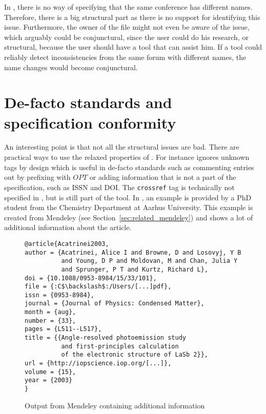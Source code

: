 In {\bibtex}, there is no way of specifying that the same conference
has different names.  Therefore, there is a big structural part as
there is no support for identifying this issue.  Furthermore, the
owner of the {\bibtex} file might not even be aware of the issue,
which arguably could be conjunctural, since the user could do his
research, or structural, because the user should have a tool that can
assist him.  If a tool could reliably detect inconsistencies from the
same forum with different names, the name changes would become
conjunctural.


\section{De-facto standards and specification conformity}
\label{sec:problems_de_facto}

An interesting point is that not all the structural issues are bad.
There are practical ways to use the relaxed properties of {\bibtex}.
For instance {\bibtex} ignores unknown tags by design which is useful
in de-facto standards such as commenting entries out by prefixing with
$OPT$ or adding information that is not a part of the {\bibtex}
specification, such as ISSN and DOI.  The \texttt{crossref} tag is
technically not specified in {\bibtex}, but is still part of the tool.
In , an example is provided by a PhD
student from the Chemistry Department at Aarhus University.  This
example is created from Mendeley (see
Section~\ref{sec:related_mendeley}) and shows a lot of additional
information about the article.

\begin{figure}
  \centering
\begin{small}
\begin{verbatim}
@article{Acatrinei2003,
author = {Acatrinei, Alice I and Browne, D and Losovyj, Y B
          and Young, D P and Moldovan, M and Chan, Julia Y
          and Sprunger, P T and Kurtz, Richard L},
doi = {10.1088/0953-8984/15/33/101},
file = {:C$\backslash$:/Users/[...]pdf},
issn = {0953-8984},
journal = {Journal of Physics: Condensed Matter},
month = {aug},
number = {33},
pages = {L511--L517},
title = {{Angle-resolved photoemission study
          and first-principles calculation
          of the electronic structure of LaSb 2}},
url = {http://iopscience.iop.org/[...]},
volume = {15},
year = {2003}
}
\end{verbatim}
\end{small}
  \caption{Output from Mendeley containing additional information}
\label{fig:mendeley_output}
\end{figure}

